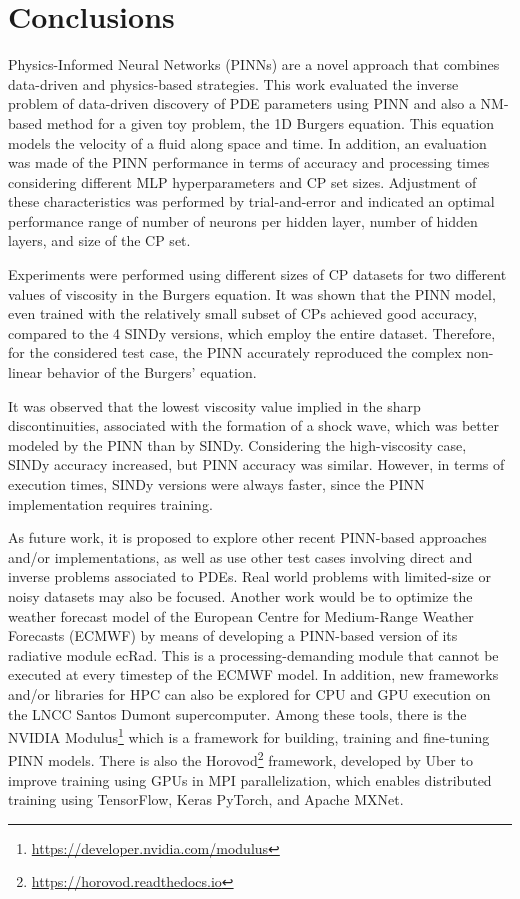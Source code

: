 \documentclass[conference]{IEEEtran}
\begin{document}
\section{Conclusions}
\label{sec:conc}

Physics-Informed Neural Networks (PINNs) are a novel approach that combines data-driven and physics-based strategies. This work evaluated the inverse problem of data-driven discovery of PDE parameters using PINN and also a NM-based method for a given toy problem, the 1D Burgers equation. This equation models the velocity of a fluid along space and time. In addition, an evaluation was made of the PINN performance in terms of accuracy and processing times considering different MLP hyperparameters and CP set sizes. Adjustment of these characteristics was performed by trial-and-error and indicated an optimal performance range of number of neurons per hidden layer, number of hidden layers, and size of the CP set.

Experiments were performed using different sizes of CP datasets for two different values of viscosity in the Burgers equation. It was shown that the PINN model, even trained with the relatively small subset of CPs achieved good accuracy, compared to the 4 SINDy versions, which employ the entire dataset. Therefore, for the considered test case, the PINN accurately reproduced the complex non-linear behavior of the Burgers' equation.

It was observed that the lowest viscosity value implied in the sharp discontinuities, associated with the formation of a shock wave, which was better modeled by the PINN than by SINDy. Considering the high-viscosity case, SINDy accuracy increased, but PINN accuracy was similar. However, in terms of execution times, SINDy versions were always faster, since the PINN implementation requires training.


As future work, it is proposed to explore other recent PINN-based approaches and/or implementations, as well as use other test cases involving direct and inverse problems associated to PDEs. Real world problems with limited-size or noisy datasets may also be focused. Another work would be to optimize the weather forecast model of the European Centre for Medium-Range Weather Forecasts (ECMWF) by means of developing a PINN-based version of its radiative module ecRad. This is a processing-demanding module that cannot be executed at every timestep of the ECMWF model. In addition, new frameworks and/or libraries for HPC can also be explored for CPU and GPU execution on the LNCC Santos Dumont supercomputer. Among these tools, there is the NVIDIA Modulus\footnote{\url{https://developer.nvidia.com/modulus}} which is a framework for building, training and fine-tuning PINN models. There is also the Horovod\footnote{\url{https://horovod.readthedocs.io}} framework, developed by Uber to improve training using GPUs in MPI parallelization, which enables distributed training using TensorFlow, Keras PyTorch, and Apache MXNet.
\end{document}
